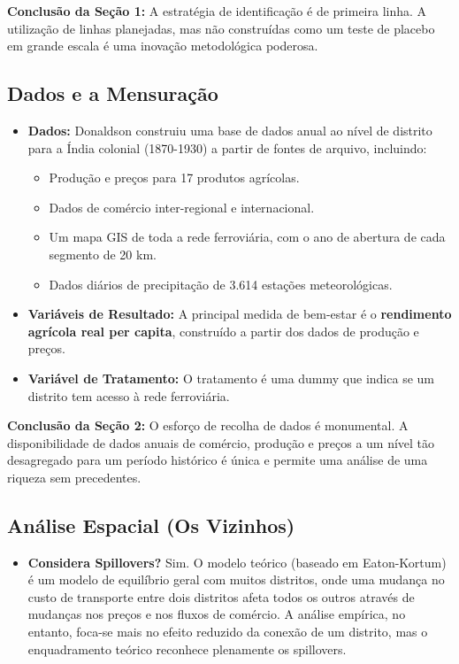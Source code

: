 \documentclass[12pt, a4paper]{article}
\begin{document}
\noindent\textbf{Conclusão da Seção 1:} A estratégia de identificação é de primeira linha. A utilização de linhas planejadas, mas não construídas como um teste de placebo em grande escala é uma inovação metodológica poderosa.

\subsection{Dados e a Mensuração}

\begin{itemize}
    \item \textbf{Dados:} Donaldson construiu uma base de dados anual ao nível de distrito para a Índia colonial (1870-1930) a partir de fontes de arquivo, incluindo:
        \begin{itemize}
            \item Produção e preços para 17 produtos agrícolas.
            \item Dados de comércio inter-regional e internacional.
            \item Um mapa GIS de toda a rede ferroviária, com o ano de abertura de cada segmento de 20 km.
            \item Dados diários de precipitação de 3.614 estações meteorológicas.
        \end{itemize}
    \item \textbf{Variáveis de Resultado:} A principal medida de bem-estar é o \textbf{rendimento agrícola real per capita}, construído a partir dos dados de produção e preços.
    \item \textbf{Variável de Tratamento:} O tratamento é uma dummy que indica se um distrito tem acesso à rede ferroviária.
\end{itemize}

\noindent\textbf{Conclusão da Seção 2:} O esforço de recolha de dados é monumental. A disponibilidade de dados anuais de comércio, produção e preços a um nível tão desagregado para um período histórico é única e permite uma análise de uma riqueza sem precedentes.

\subsection{Análise Espacial (Os Vizinhos)}

\begin{itemize}
    \item \textbf{Considera Spillovers?} Sim. O modelo teórico (baseado em Eaton-Kortum) é um modelo de equilíbrio geral com muitos distritos, onde uma mudança no custo de transporte entre dois distritos afeta todos os outros através de mudanças nos preços e nos fluxos de comércio. A análise empírica, no entanto, foca-se mais no efeito reduzido da conexão de um distrito, mas o enquadramento teórico reconhece plenamente os spillovers.
\end{itemize}
\end{document}
